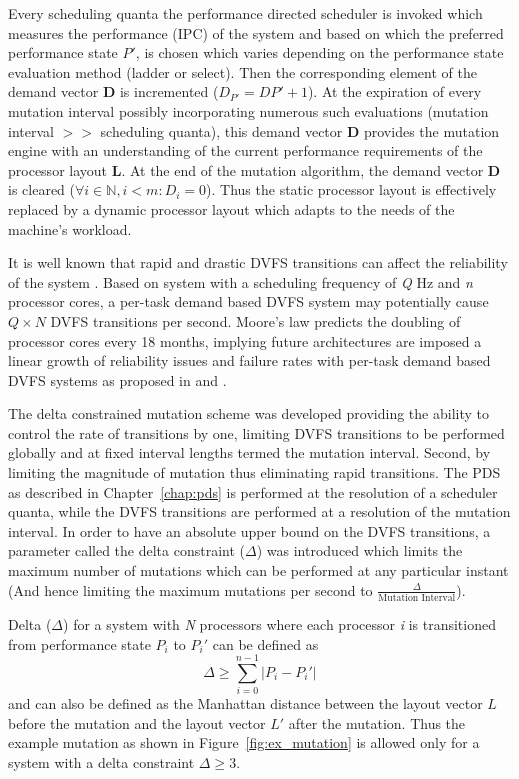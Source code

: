Every scheduling quanta the performance directed scheduler is invoked which 
measures the performance (IPC) of the system and based on which the preferred
performance state $P'$, is chosen which varies depending 
on the performance state evaluation method (ladder or select). Then the corresponding
element of the demand vector \textbf{D} is incremented ($D_{P'} = D{P'} + 1$).
At the expiration of every mutation interval possibly incorporating numerous such
evaluations (mutation interval $>>$ scheduling quanta), this demand vector \textbf{D}
provides the mutation engine with an understanding of the current performance
requirements of the processor layout \textbf{L}. 
At the end of the mutation algorithm, the demand vector \textbf{D} is cleared
($\forall i \in \mathbb{N}, i < m: D_i = 0$). Thus the static processor layout
is effectively replaced by a dynamic processor layout which adapts to the needs
of the machine's workload.

It is well known that rapid and drastic DVFS transitions can affect the reliability 
of the system \cite{ImpactDVFS}.
Based on system with a scheduling frequency of \textit{Q} Hz
and \textit{n} processor cores, a per-task demand based DVFS system may potentially cause $Q \times N$ 
DVFS transitions per second. Moore's law predicts the doubling of processor cores every 18 months, implying
future architectures are imposed a linear growth of reliability issues and failure rates with per-task
demand based DVFS systems as proposed in \cite{LiveRuntime} and \cite{Phaseaware}. 

The delta constrained mutation scheme was developed providing the ability to control the rate of transitions
by one, limiting DVFS transitions to be performed globally and at fixed interval lengths termed the mutation
interval. Second, by limiting the magnitude of mutation thus eliminating rapid transitions.
The PDS as described in Chapter~\ref{chap:pds} is performed at the resolution of a scheduler quanta, while
the DVFS transitions are performed at a resolution of the mutation interval. In order to have an absolute
upper bound on the DVFS transitions, a parameter called the delta constraint ($\Delta$) was introduced
which limits the maximum number of mutations which can be performed at any particular instant (And hence
limiting the maximum mutations per second to $\frac{\Delta}{\text{Mutation Interval}}$). 

Delta ($\Delta$) for a system with \textit{N} processors where each processor \textit{i} is transitioned
from performance state $P_{i}$ to $P_{i}'$ can be defined as
\begin{equation}
    \Delta \geq \displaystyle\sum_{i=0}^{n-1} {| P_{i} - P_{i}' |}
\label{eq:Delta_def}
\end{equation}
and can also be defined as the Manhattan distance between the layout vector $L$ before the mutation and 
the layout vector $L'$ after the mutation. Thus the example mutation as shown in Figure~\ref{fig:ex_mutation}
is allowed only for a system with a delta constraint $\Delta \geq 3$. 

